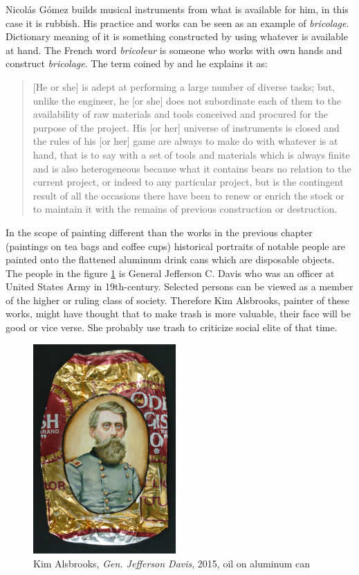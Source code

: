 Nicolás Gómez builds musical instruments from what is available for him, in this case it is rubbish. His practice and works can be seen as an example of \textit{bricolage}. Dictionary meaning of it is something constructed by using whatever is available at hand. The French word \textit{bricoleur} is someone who works with own hands and construct \textit{bricolage}. The term coined by \citet[17]{levi1966savage} and he explains it as:

\begin{quote}
[He or she] is adept at performing a large number of diverse tasks; but, unlike the engineer, he [or she] does not subordinate each of them to the availability of raw materials and tools conceived and procured for the purpose of the project. His [or her] universe of instruments is closed and the rules of his [or her] game are always to make do with whatever is at hand, that is to say with a set of tools and materials which is always finite and is also heterogeneous because what it contains bears no relation to the current project, or indeed to any particular project, but is the contingent result of all the occasions there have been to renew or enrich the stock or to maintain it with the remains of previous construction or destruction. 
\end{quote}

In the scope of painting different than the works in the previous chapter (paintings on tea bags and coffee cups) historical portraits of notable people are painted onto the flattened aluminum drink cans which are disposable objects. The people in the figure \ref{fig:Alsbrooks} is General Jefferson C. Davis who was an officer at United States Army in 19th-century. Selected persons can be viewed as a member of the higher or ruling class of society. Therefore Kim Alsbrooks, painter of these works, might have thought that to make trash is more valuable, their face will be good or vice verse. She probably use trash to criticize social elite of that time. 

\begin{figure}[h!]
  \centering
  \includegraphics[height=8cm]{graphics/Alsbrooks.jpg}
  \caption{Kim Alsbrooks, \textit{Gen. Jefferson Davis}, 2015, oil on aluminum can}
  \label{fig:Alsbrooks}
\end{figure}

